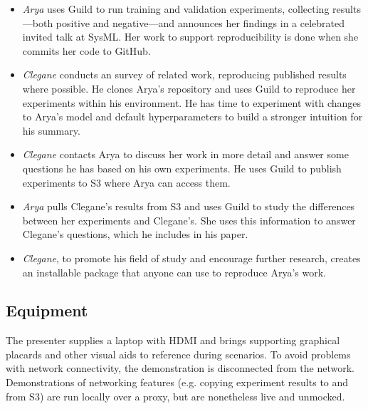 \documentclass{article}
\begin{document}
\begin{itemize}[topsep=3pt]
\item \emph{Arya} uses Guild to run training and validation
  experiments, collecting results---both positive and negative---and
  announces her findings in a celebrated invited talk at SysML. Her
  work to support reproducibility is done when she commits her code to
  GitHub.

\item \emph{Clegane} conducts an survey of related work, reproducing
  published results where possible. He clones Arya's repository and
  uses Guild to reproduce her experiments within his environment. He
  has time to experiment with changes to Arya's model and default
  hyperparameters to build a stronger intuition for his summary.

\item \emph{Clegane} contacts Arya to discuss her work in more detail
  and answer some questions he has based on his own experiments. He
  uses Guild to publish experiments to S3 where Arya can access them.

\item \emph{Arya} pulls Clegane's results from S3 and uses Guild to
  study the differences between her experiments and Clegane's. She
  uses this information to answer Clegane's questions, which he
  includes in his paper.

\item \emph{Clegane}, to promote his field of study and encourage
  further research, creates an installable package that anyone can use
  to reproduce Arya's work.
\end{itemize}

\subsection{Equipment}

The presenter supplies a laptop with HDMI and brings supporting
graphical placards and other visual aids to reference during
scenarios. To avoid problems with network connectivity, the
demonstration is disconnected from the network. Demonstrations of
networking features (e.g. copying experiment results to and from S3)
are run locally over a proxy, but are nonetheless live and unmocked.



\end{document}
